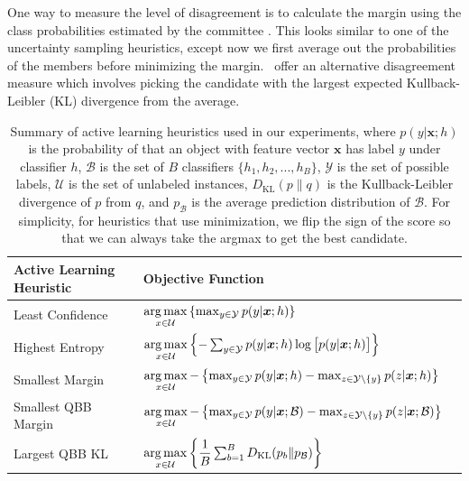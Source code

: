 \documentclass[fleqn,10pt,lineno]{wlpeerj} %
\newcommand{\B}{\mathcal{B}}
\newcommand{\Y}{\mathcal{Y}}
\newcommand{\Unlabelled}{\mathcal{U}}
\newcommand*{\argmax}{\operatornamewithlimits{arg\,max}\limits}
\begin{document}
One way to measure the level of disagreement is to calculate the margin using
the class probabilities estimated by the committee \citep{melville04}. This
looks similar to one of the uncertainty sampling heuristics, except now we
first average out the probabilities of the members before minimizing the
margin.~\cite{mccallum98} offer an alternative disagreement measure which
involves picking the candidate with the largest expected Kullback-Leibler (KL)
divergence from the average.

\begin{table}[h]
	\caption {Summary of active learning heuristics used in our experiments,
			  where $p(y | \bm{x}; h)$ is the probability of that an object
			  with feature vector $\bm{x}$ has label $y$ under classifier $h$,
			  $\B$ is the set of $B$ classifiers $\{h_1, h_2, ..., h_B\}$, $\Y$
			  is the set of possible labels, $\Unlabelled$ is the set of
			  unlabeled instances, $D_{\mathrm{KL}}(p\|q)$ is the
			  Kullback-Leibler divergence of $p$ from $q$, and $p_\B$ is the
			  average prediction distribution of $\B$. For simplicity,
			  for heuristics that use minimization, we flip the sign of the
			  score so that we can always take the argmax to get the best
			  candidate.}
	\label{tab:heuristics}
	\centering
	\begin{tabular}{lll}
		\toprule
		{Active Learning Heuristic}  &  Objective Function  \\
		\midrule
        Least Confidence &
			$\argmax_{x \in \Unlabelled}
			\left\{ \max_{y \in \Y} p(y | \bm{x}; h) \right\}$ \\
		Highest Entropy &
			$\argmax_{x \in \Unlabelled} \left\{-\sum_{y \in \Y} p(y | \bm{x}; h)
            \log \big[ p(y | \bm{x}; h) \big] \right\}$
			\\[2ex]
		Smallest Margin &
			$\argmax_{x \in \Unlabelled} - \left\{ \max_{y \in \Y} p(y | \bm{x}; h) -
            \max_{z \in \Y \setminus \{y\}} p(z | \bm{x}; h)  \right\}$
			\\[2ex]
		Smallest QBB Margin &
			$\argmax_{x \in \Unlabelled} - \left\{ \max_{y \in \Y} p(y | \bm{x}; \B) -
            \max_{z \in \Y \setminus \{y\}} p(z | \bm{x}; \B)  \right\}$
			\\[2ex]
		Largest QBB KL &
			$\argmax_{x \in \Unlabelled} \left\{ \dfrac{1}{B}
               \sum_{b=1}^B D_{\mathrm{KL}}(p_b\|p_\B) \right\}$
			\\
		\bottomrule
	\end{tabular}
\end{table}
\end{document}
